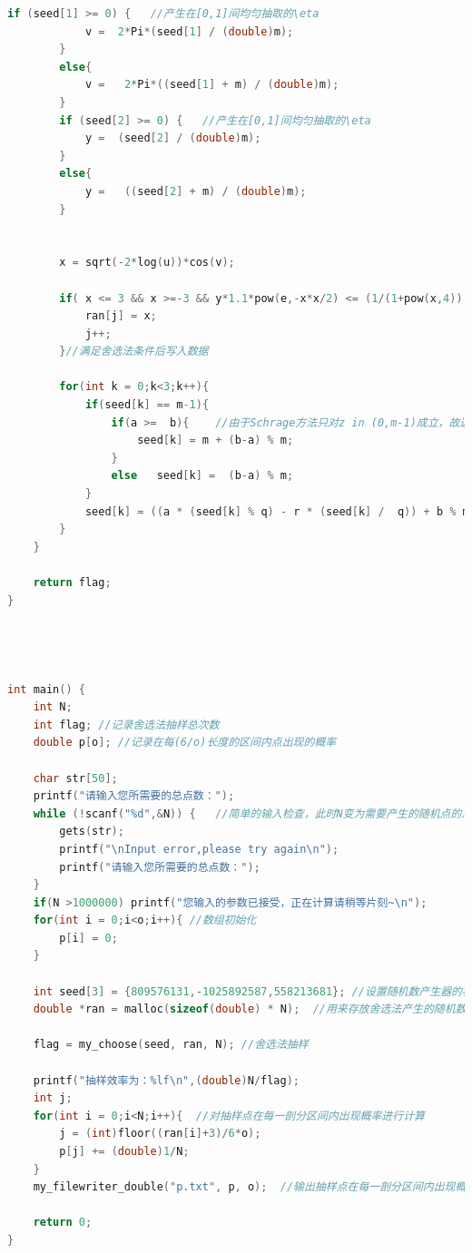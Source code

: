 \documentclass[a4paper,11pt]{article}
\begin{document}
\begin{appendices}
\begin{lstlisting}[language = C]
        if (seed[1] >= 0) {   //产生在[0,1]间均匀抽取的\eta
            v =  2*Pi*(seed[1] / (double)m);
        }
        else{
            v =   2*Pi*((seed[1] + m) / (double)m);
        }
        if (seed[2] >= 0) {   //产生在[0,1]间均匀抽取的\eta
            y =  (seed[2] / (double)m);
        }
        else{
            y =   ((seed[2] + m) / (double)m);
        }
        
        
        x = sqrt(-2*log(u))*cos(v);
        
        if( x <= 3 && x >=-3 && y*1.1*pow(e,-x*x/2) <= (1/(1+pow(x,4))) ){ //舍选条件判断
            ran[j] = x;
            j++;
        }//满足舍选法条件后写入数据

        for(int k = 0;k<3;k++){
            if(seed[k] == m-1){
                if(a >=  b){    //由于Schrage方法只对z in (0,m-1)成立，故这里要讨论z == m-1的情况
                    seed[k] = m + (b-a) % m;
                }
                else   seed[k] =  (b-a) % m;
            }
            seed[k] = ((a * (seed[k] % q) - r * (seed[k] /  q)) + b % m ) % m;
        }
    }
    
    return flag;
}




int main() {
    int N;
    int flag; //记录舍选法抽样总次数
    double p[o]; //记录在每(6/o)长度的区间内点出现的概率
    
    char str[50];
    printf("请输入您所需要的总点数：");
    while (!scanf("%d",&N)) {   //简单的输入检查，此时N变为需要产生的随机点的总数
        gets(str);
        printf("\nInput error,please try again\n");
        printf("请输入您所需要的总点数：");
    }
    if(N >1000000) printf("您输入的参数已接受，正在计算请稍等片刻~\n");
    for(int i = 0;i<o;i++){ //数组初始化
        p[i] = 0;
    }

    int seed[3] = {809576131,-1025892587,558213681}; //设置随机数产生器的初始种子值
    double *ran = malloc(sizeof(double) * N);  //用来存放舍选法产生的随机数
    
    flag = my_choose(seed, ran, N); //舍选法抽样
    
    printf("抽样效率为：%lf\n",(double)N/flag);
    int j;
    for(int i = 0;i<N;i++){  //对抽样点在每一剖分区间内出现概率进行计算
        j = (int)floor((ran[i]+3)/6*o);
        p[j] += (double)1/N;
    }
    my_filewriter_double("p.txt", p, o);  //输出抽样点在每一剖分区间内出现概率至文件

    return 0;
}

\end{lstlisting}


\end{appendices}
\end{document}
